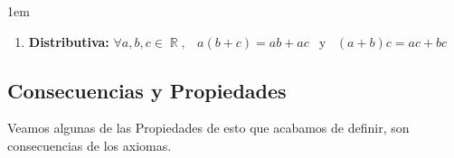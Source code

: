 \documentclass[12pt, fleqn]{report}                             %
\newenvironment{SmallIndentation}[1][0.75em]                    %
        {\begin{adjustwidth}{#1}{}\begin{footnotesize}}             %
        {\end{footnotesize}\end{adjustwidth}}                       %
\DeclareMathOperator \Space     {\quad}                         %
\DeclareMathOperator \MiniSpace {\;}                            %
\newcommand \Also           {\MiniSpace \text{y} \MiniSpace}    %
\theoremstyle{break}                                            %
\DeclareMathOperator \Reals        {\mathbb{R}}                 %
\begin{document}
\begin{SmallIndentation}[1em]
\begin{enumerate}
                        \item 
                            \textbf{Distributiva:}
                            $\forall a, b, c \in \Reals, \MiniSpace
                                    a(b + c) = ab + ac \Also (a + b)c = ac + bc$

                    \end{enumerate}

                \end{SmallIndentation}


            \clearpage
            \subsection{Consecuencias y Propiedades}

                Veamos algunas de las Propiedades de esto que acabamos de definir, son consecuencias de los 
                axiomas.
\end{document}
